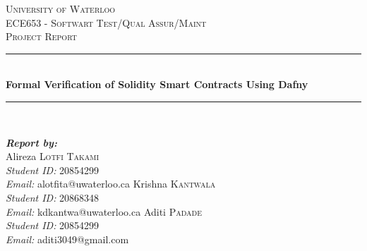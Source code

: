 \documentclass[11pt]{article}
\begin{document}
\onehalfspacing

\setlength{\droptitle}{-5em} %

\begin{titlepage}
\newcommand{\HRule}{\rule{\linewidth}{0.1mm}} 
\center %
 

\textsc{\Large University of Waterloo}\\ %
\textsc{\Large ECE653 - Softwart Test/Qual Assur/Maint}\\ %
\textsc{\large Project Report}\\ %

\HRule \\[0.4cm]
{ \huge \bfseries Formal Verification of Solidity Smart Contracts Using Dafny }\\[0.1cm] %
\HRule \\[1.5cm]
 

\begin{minipage}{0.4\textwidth}
\begin{flushleft} \large

\emph{\bfseries Report by:}\\
Alireza \textsc{Lotfi Takami}\\
\emph{Student ID:} 20854299\\
\emph{Email:} alotfita@uwaterloo.ca
Krishna \textsc{Kantwala}\\
\emph{Student ID:} 20868348\\
\emph{Email:} kdkantwa@uwaterloo.ca
Aditi \textsc{Padade}\\
\emph{Student ID:} 20854299\\
\emph{Email:} aditi3049@gmail.com
\end{flushleft}


\end{minipage}
\end{titlepage}
\end{document}

